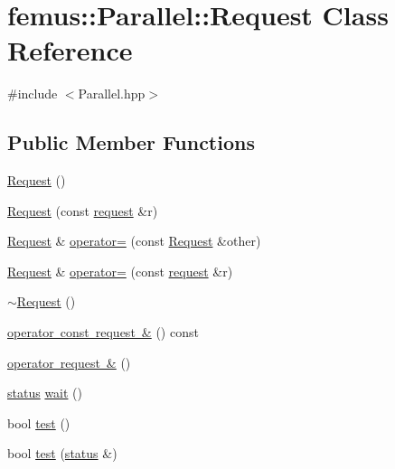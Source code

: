 \hypertarget{classfemus_1_1_parallel_1_1_request}{}\section{femus\+:\+:Parallel\+:\+:Request Class Reference}
\label{classfemus_1_1_parallel_1_1_request}


{\ttfamily \#include $<$Parallel.\+hpp$>$}

\subsection*{Public Member Functions}
\begin{DoxyCompactItemize}
\item 
\mbox{\hyperlink{classfemus_1_1_parallel_1_1_request_a7afaf981b0f0e3be69a4e9de5c985cfd}{Request}} ()
\item 
\mbox{\hyperlink{classfemus_1_1_parallel_1_1_request_a5e9c158e05c3f2fd19c1f3f63b15717e}{Request}} (const \mbox{\hyperlink{structfemus_1_1_parallel_1_1request}{request}} \&r)
\item 
\mbox{\hyperlink{classfemus_1_1_parallel_1_1_request}{Request}} \& \mbox{\hyperlink{classfemus_1_1_parallel_1_1_request_a87d6cc243a5fd162d9fbcb3e94f54099}{operator=}} (const \mbox{\hyperlink{classfemus_1_1_parallel_1_1_request}{Request}} \&other)
\item 
\mbox{\hyperlink{classfemus_1_1_parallel_1_1_request}{Request}} \& \mbox{\hyperlink{classfemus_1_1_parallel_1_1_request_a054625cad97b6e946461832a2cdfa9a0}{operator=}} (const \mbox{\hyperlink{structfemus_1_1_parallel_1_1request}{request}} \&r)
\item 
\mbox{\hyperlink{classfemus_1_1_parallel_1_1_request_ab8125f4e48b801cd6d01798b683098d8}{$\sim$\+Request}} ()
\item 
\mbox{\hyperlink{classfemus_1_1_parallel_1_1_request_afb63d51b8a02ca0d3620d91daa50e07a}{operator const request \&}} () const
\item 
\mbox{\hyperlink{classfemus_1_1_parallel_1_1_request_acfeca7685161f89c4ecf9211220ba542}{operator request \&}} ()
\item 
\mbox{\hyperlink{structfemus_1_1_parallel_1_1status}{status}} \mbox{\hyperlink{classfemus_1_1_parallel_1_1_request_a6aa01007e11e607cc48a117a39cc04da}{wait}} ()
\item 
bool \mbox{\hyperlink{classfemus_1_1_parallel_1_1_request_ab16aedfa9207bcf1a8f16052300788a3}{test}} ()
\item 
bool \mbox{\hyperlink{classfemus_1_1_parallel_1_1_request_a15f1f5dfd71723f38a4d387cbd4dc24a}{test}} (\mbox{\hyperlink{structfemus_1_1_parallel_1_1status}{status}} \&)
\end{DoxyCompactItemize}



